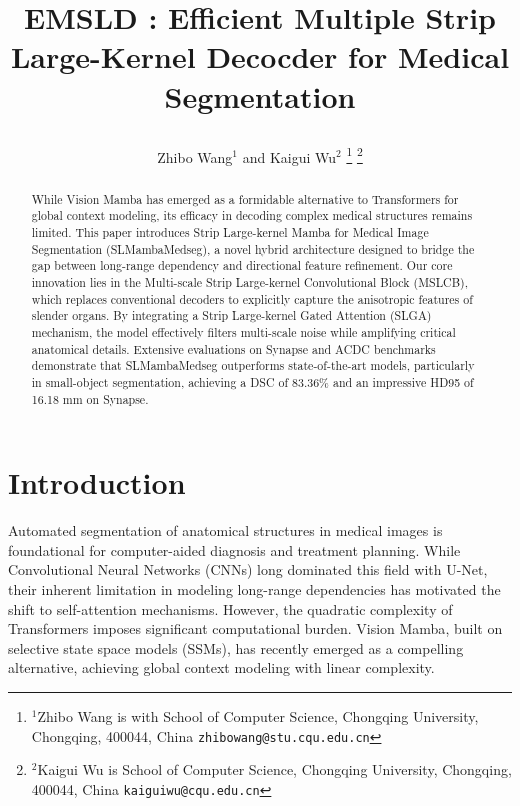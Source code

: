 \documentclass[letterpaper, 10 pt, conference]{ieeeconf}  %
\title{\LARGE \bf
EMSLD : Efficient Multiple Strip Large-Kernel Decocder for Medical Segmentation 

}
\author{Zhibo Wang$^{1}$ and Kaigui Wu$^{2}$\textsuperscript{\Letter}%
\thanks{$^{1}$Zhibo Wang is with School of Computer Science, Chongqing University, Chongqing, 400044, China
        {\tt\small zhibowang@stu.cqu.edu.cn}}%
\thanks{$^{2}$Kaigui Wu is School of Computer Science, Chongqing University, Chongqing, 400044, China
        {\tt\small kaiguiwu@cqu.edu.cn}}%
}
\begin{document}
\maketitle
\thispagestyle{empty}
\pagestyle{empty}


\begin{abstract}

While Vision Mamba has emerged as a formidable alternative to Transformers for global context modeling, its efficacy in decoding complex medical structures remains limited. This paper introduces Strip Large-kernel Mamba for Medical Image Segmentation (SLMambaMedseg), a novel hybrid architecture designed to bridge the gap between long-range dependency and directional feature refinement. Our core innovation lies in the Multi-scale Strip Large-kernel Convolutional Block (MSLCB), which replaces conventional decoders to explicitly capture the anisotropic features of slender organs. By integrating a Strip Large-kernel Gated Attention (SLGA) mechanism, the model effectively filters multi-scale noise while amplifying critical anatomical details. Extensive evaluations on Synapse and ACDC benchmarks demonstrate that SLMambaMedseg outperforms state-of-the-art models, particularly in small-object segmentation, achieving a DSC of 83.36\% and an impressive HD95 of 16.18 mm on Synapse.

\end{abstract}





\section{Introduction}

Automated segmentation of anatomical structures in medical images is foundational for computer-aided diagnosis and treatment planning\cite{ronneberger2015unet,milletari2016vnet,isensee2021nnu}. While Convolutional Neural Networks (CNNs) long dominated this field with U-Net, their inherent limitation in modeling long-range dependencies has motivated the shift to self-attention mechanisms\cite{chen2021transunet,cao2021swinunet}. However, the quadratic complexity of Transformers imposes significant computational burden. Vision Mamba\cite{gu2023mamba,liu2024vmamba,zhu2024vim}, built on selective state space models (SSMs), has recently emerged as a compelling alternative, achieving global context modeling with linear complexity.
\end{document}
